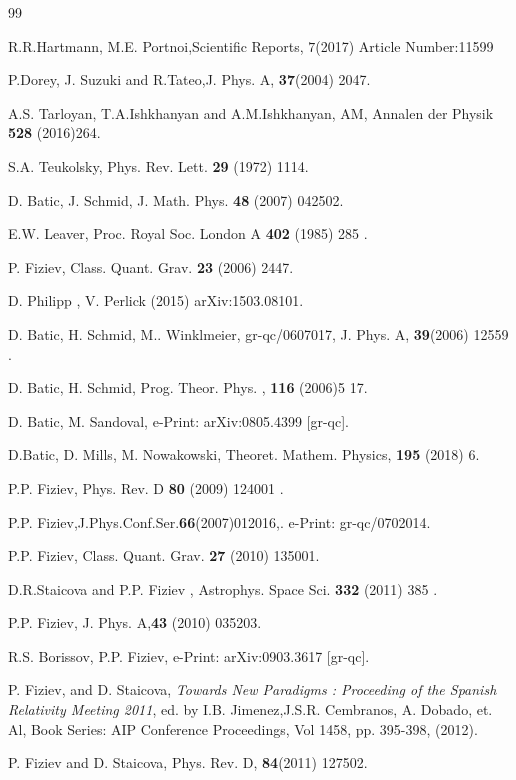 \documentclass{article}
\begin{document}
\begin{thebibliography}{99}
{ R.R.Hartmann, M.E. Portnoi,Scientific Reports, $\mathit{7}$(2017)
Article Number:11599

 P.Dorey, J. Suzuki and R.Tateo,J.  Phys. A, \textbf{37}(2004) 2047.

A.S. Tarloyan, T.A.Ishkhanyan and  A.M.Ishkhanyan, AM, Annalen der
Physik \textbf{528} (2016)264.

 S.A. Teukolsky, Phys. Rev. Lett. \textbf{29} (1972) 1114.

 D. Batic, J. Schmid, J. Math. Phys.  \textbf{48} (2007) 042502.

 E.W. Leaver, Proc.  Royal Soc. London A \textbf{402} (1985) 285 .

 P. Fiziev, Class. Quant. Grav. \textbf{23} (2006) 2447.

 D. Philipp , V. Perlick (2015) arXiv:1503.08101.

 D. Batic, H. Schmid, M.. Winklmeier, gr-qc/0607017, J. Phys. A, \textbf{39}(2006) 12559 .

 D. Batic, H. Schmid, Prog.  Theor. Phys. , \textbf{116} (2006)5 17.

 D. Batic, M. Sandoval, e-Print: arXiv:0805.4399 [gr-qc].

 D.Batic, D. Mills, M. Nowakowski, Theoret. Mathem. Physics, \textbf{195} (2018) 6. 

 P.P. Fiziev, Phys. Rev. D \textbf{80} (2009) 124001 .

 P.P. Fiziev,J.Phys.Conf.Ser.\textbf{66}(2007)012016,. e-Print: gr-qc/0702014.

 P.P. Fiziev, Class.  Quant. Grav. \textbf{27} (2010) 135001.

  D.R.Staicova and P.P. Fiziev , Astrophys. Space Sci. \textbf{332} (2011) 385 .

 P.P. Fiziev, J. Phys. A,\textbf{43} (2010)  035203.

 R.S. Borissov, P.P. Fiziev,  e-Print: arXiv:0903.3617 [gr-qc].

 P. Fiziev, and D. Staicova, \textit{Towards New Paradigms : Proceeding of the Spanish Relativity Meeting 2011}, ed. by I.B. Jimenez,J.S.R. Cembranos, A. Dobado, et. Al, Book Series: AIP Conference Proceedings, Vol 1458, pp. 395-398, (2012).

 P. Fiziev and D. Staicova, Phys.  Rev. D, \textbf{84}(2011) 127502.

}
\end{thebibliography}
\end{document}
